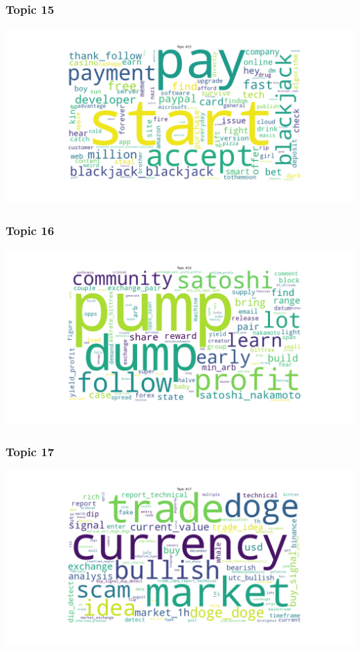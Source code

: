 \documentclass[
]{article}
\begin{document}
\hypertarget{topic-15}{%
\subsubsection{Topic 15}\label{topic-15}}

\includegraphics[width=7.8125in,height=\textheight]{images/03 - Topic_15.png}

\hypertarget{topic-16}{%
\subsubsection{Topic 16}\label{topic-16}}

\includegraphics[width=7.8125in,height=\textheight]{images/03 - Topic_16.png}

\hypertarget{topic-17}{%
\subsubsection{Topic 17}\label{topic-17}}

\includegraphics[width=7.8125in,height=\textheight]{images/03 - Topic_17.png}
\end{document}
